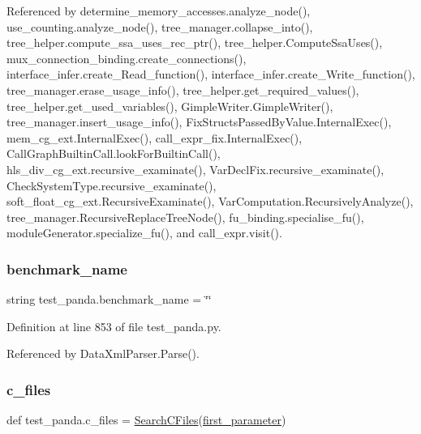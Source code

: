 Referenced by determine\+\_\+memory\+\_\+accesses.\+analyze\+\_\+node(), use\+\_\+counting.\+analyze\+\_\+node(), tree\+\_\+manager.\+collapse\+\_\+into(), tree\+\_\+helper.\+compute\+\_\+ssa\+\_\+uses\+\_\+rec\+\_\+ptr(), tree\+\_\+helper.\+Compute\+Ssa\+Uses(), mux\+\_\+connection\+\_\+binding.\+create\+\_\+connections(), interface\+\_\+infer.\+create\+\_\+\+Read\+\_\+function(), interface\+\_\+infer.\+create\+\_\+\+Write\+\_\+function(), tree\+\_\+manager.\+erase\+\_\+usage\+\_\+info(), tree\+\_\+helper.\+get\+\_\+required\+\_\+values(), tree\+\_\+helper.\+get\+\_\+used\+\_\+variables(), Gimple\+Writer.\+Gimple\+Writer(), tree\+\_\+manager.\+insert\+\_\+usage\+\_\+info(), Fix\+Structs\+Passed\+By\+Value.\+Internal\+Exec(), mem\+\_\+cg\+\_\+ext.\+Internal\+Exec(), call\+\_\+expr\+\_\+fix.\+Internal\+Exec(), Call\+Graph\+Builtin\+Call.\+look\+For\+Builtin\+Call(), hls\+\_\+div\+\_\+cg\+\_\+ext.\+recursive\+\_\+examinate(), Var\+Decl\+Fix.\+recursive\+\_\+examinate(), Check\+System\+Type.\+recursive\+\_\+examinate(), soft\+\_\+float\+\_\+cg\+\_\+ext.\+Recursive\+Examinate(), Var\+Computation.\+Recursively\+Analyze(), tree\+\_\+manager.\+Recursive\+Replace\+Tree\+Node(), fu\+\_\+binding.\+specialise\+\_\+fu(), module\+Generator.\+specialize\+\_\+fu(), and call\+\_\+expr.\+visit().

\mbox{\label{namespacetest__panda_a6adac05e8fa7baf5d3b2f9874ca64d1e}} 
\subsubsection{\texorpdfstring{benchmark\+\_\+name}{benchmark\_name}}
{\footnotesize\ttfamily string test\+\_\+panda.\+benchmark\+\_\+name = \char`\"{}\char`\"{}}



Definition at line 853 of file test\+\_\+panda.\+py.



Referenced by Data\+Xml\+Parser.\+Parse().

\mbox{\label{namespacetest__panda_a7b869db3f6bfe3c484270ba1a5298262}} 
\subsubsection{\texorpdfstring{c\+\_\+files}{c\_files}}
{\footnotesize\ttfamily def test\+\_\+panda.\+c\+\_\+files = \hyperlink{namespacetest__panda_a8292fd9f0436c65b76dc0689a5be68c0}{Search\+C\+Files}(\hyperlink{namespacetest__panda_aeecf7e98e2fb79a7524ba0a517d191fc}{first\+\_\+parameter})}



